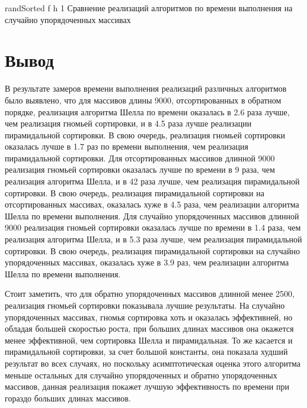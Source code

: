 {randSorted} %
{f} %
{h} %
{1\textwidth} %
{Сравнение реализаций алгоритмов по времени выполнения на случайно упорядоченных массивах} %

\clearpage

\section*{Вывод}

В результате замеров времени выполнения реализаций различных алгоритмов было выявлено, что для массивов длины 9000, отсортированных в обратном порядке, реализация алгоритма Шелла по времени оказалась в 2.6 раза лучше, чем реализация гномьей сортировки, и в 4.5 раза лучше реализации пирамидальной сортировки.
В свою очередь, реализация гномьей сортировки оказалась лучше в 1.7 раз по времени выполнения, чем реализация пирамидальной сортировки.
Для отсортированных массивов длинной 9000 реализация гномьей сортировки оказалась лучше по времени в 9 раза, чем реализация алгоритма Шелла, и в 42 раза лучше, чем реализация пирамидальной сортировки. 
В свою очередь, реализация пирамидальной сортировки на отсортированных массивах, оказалась хуже в 4.5 раза, чем реализации алгоритма Шелла по времени выполнения.
Для случайно упорядоченных массивов длинной 9000 реализация гномьей сортировки оказалась лучше по времени в 1.4 раза, чем реализация алгоритма Шелла, и в 5.3 раза лучше, чем реализация пирамидальной сортировки. 
В свою очередь, реализация пирамидальной сортировки на случайно упорядоченных массивах, оказалась хуже в 3.9 раз, чем реализации алгоритма Шелла по времени выполнения.

Стоит заметить, что для обратно упорядоченных массивов длинной менее 2500, реализация гномьей сортировки показывала лучшие результаты. 
На случайно упорядоченных массивах, гномья сортировка хоть и оказалась эффективней, но обладая большей скоростью роста, при больших длинах массивов она окажется менее эффективной, чем сортировка Шелла и пирамидальная. 
То же касается и пирамидальной сортировки, за счет большой константы, она показала худший результат во всех случаях, но поскольку асимптотическая оценка этого алгоритма меньше остальных для случайно упорядоченных и обратно упорядоченных массивов, данная реализация покажет лучшую эффективность по времени при гораздо больших длинах массивов.